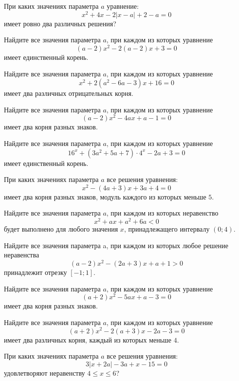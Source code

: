 \begin{homework}[number=1]
	\begin{listofex}
		\item При каких значениях параметра \( a \) уравнение:
		\[ x^2+4x-2|x-a|+2-a=0 \]
		имеет ровно два различных решения?
		\item Найдите все значения параметра \( a \), при каждом из которых уравнение
		\[ (a-2)x^2-2(a-2)x+3=0 \]
		имеет единственный корень.
		\item Найдите все значения параметра \( a \), при каждом из которых уравнение
		\[ x^2+2(a^2-6a-3)x+16=0 \]
		имеет два различных отрицательных корня.
		\item Найдите все значения параметра \( a \), при каждом из которых уравнение
		\[ (a-2)x^2-4ax+a-1=0 \]
		имеет два корня разных знаков.
		\item Найдите все значения параметра \( a \), при каждом из которых уравнение
		\[ 16^x+(3a^2+5a+7)\cdot4^x-2a+3=0 \]
		имеет единственный корень.
	\end{listofex}
\end{homework}

\begin{class}[number=3]
	\begin{listofex}
		\item При каких значениях параметра \( a \) все решения уравнения:
		\[ x^2-(4a+3)x+3a+4=0 \]
		имеет два корня разных знаков, модуль каждого из которых меньше \( 5 \).
		\item Найдите все значения параметра \( a \), при каждом из которых неравенство
		\[ x^2+ax+a^2+6a<0 \]
		будет выполнено для любого значения \( x \), принадлежащего интервалу \( (0;4) \).
		\item Найдите все значения параметра a, при каждом из которых любое решение неравенства
		\[ (a-2)x^2-(2a+3)x+a+1>0 \]
		принадлежит отрезку \( [-1;1] \).
		\item Найдите все значения параметра \( a \), при каждом из которых уравнение
		\[ (a+2)x^2-5ax+a-3=0 \]
		имеет два корня разных знаков.
		\item Найдите все значения параметра \( a \), при каждом из которых уравнение
		\[ (a+2)x^2-2(a+3)x-2a-3=0 \]
		имеет два различных корня, каждый из которых меньше \( 4 \).
		\item При каких значениях параметра \( a \) все решения уравнения:
		\[ 3|x+2a|-3a+x-15=0 \]
		удовлетворяют неравенству \( 4\le x \le6 \)?
	\end{listofex}
\end{class}


